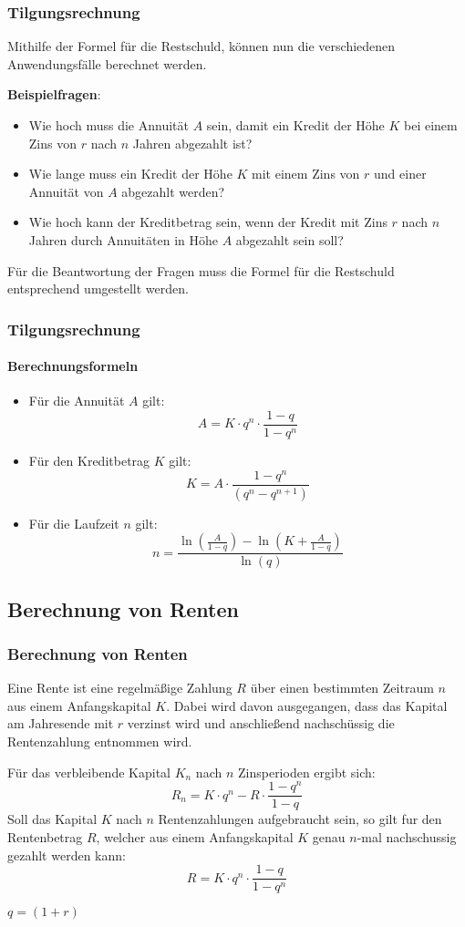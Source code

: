 \documentclass{beamer}
\begin{document}
\begin{frame}
  \frametitle{Tilgungsrechnung}  
  Mithilfe der Formel für die Restschuld, können nun die verschiedenen Anwendungsfälle berechnet werden.

  \vspace{1cm}
  \textbf{Beispielfragen}:
  \begin{itemize}
    \item Wie hoch muss die Annuität $A$ sein, damit ein Kredit der Höhe $K$ bei einem Zins von $r$ nach $n$ Jahren abgezahlt ist?
    \item Wie lange muss ein Kredit der Höhe $K$ mit einem Zins von $r$ und einer Annuität von $A$ abgezahlt werden?
    \item Wie hoch kann der Kreditbetrag sein, wenn der Kredit mit Zins $r$ nach $n$ Jahren durch Annuitäten in Höhe $A$ abgezahlt sein soll?
  \end{itemize}
  Für die Beantwortung der Fragen muss die Formel für die Restschuld entsprechend umgestellt werden.
\end{frame}

\begin{frame}
  \frametitle{Tilgungsrechnung}  
  \framesubtitle{Berechnungsformeln}
  \begin{itemize}
    \item Für die Annuität $A$ gilt: $$ A = K \cdot q^n \cdot \frac{1-q}{1-q^n}$$
    \item Für den Kreditbetrag $K$ gilt: $$ K = A\cdot \frac{1-q^n}{(q^n-q^{n+1})}$$
    \item Für die Laufzeit $n$ gilt: $$ n =     \frac{\ln(\frac{A}{1-q})-\ln(K+\frac{A}{1-q})}{\ln(q)}$$
  \end{itemize}
\end{frame}

\subsection{Berechnung von Renten}
\begin{frame}
  \frametitle{Berechnung von Renten}
  
  Eine Rente ist eine regelmäßige Zahlung $R$ über einen bestimmten Zeitraum $n$ aus einem Anfangskapital $K$. Dabei wird davon ausgegangen, dass das Kapital am Jahresende mit $r$ verzinst wird und anschließend nachschüssig die Rentenzahlung entnommen wird.
  
  \vspace{0.5cm}

  Für das verbleibende Kapital $K_n$ nach $n$ Zinsperioden ergibt sich:
  $$R_n = K \cdot q^n - R \cdot \frac{1-q^n}{1-q}$$
  Soll das Kapital $K$ nach $n$ Rentenzahlungen aufgebraucht sein, so gilt fur den
Rentenbetrag $R$, welcher aus einem Anfangskapital $K$ genau $n$-mal nachschussig
gezahlt werden kann:
$$R = K \cdot q^n \cdot \frac{1-q}{1-q^n}$$ 

$q=(1+r)$
  
\end{frame}
\end{document}
